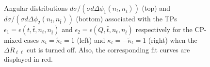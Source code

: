 \documentclass[aps,preprint,tightenlines,floatfix,superscriptaddress,nofootinbib,showpacs]{revtex4-1}
\def\tbar{\bar{t}}
\def\kp{\kappa_t}
\def\kpt{\tilde{\kappa}_t}
\def\TPa{\epsilon(t,\tbar,n_t,n_{\tbar})}
\def\TPb{\epsilon(Q,\tbar,n_t,n_{\tbar})}
\begin{document}
\begin{center}
\begin{figure}[H]
\hspace*{-0.52cm}
\hspace*{-0.006\textwidth}
\caption{Angular distributions $d\sigma/(\sigma
  d\Delta\phi_1(n_t,n_{\tbar}))$ (top) and $d\sigma/(\sigma
  d\Delta\phi_2(n_t,n_{\tbar}))$ (bottom) associated with the TPs
  $\epsilon_1=\TPa$ and $\epsilon_2=\TPb$ respectively for the
  $\mathrm{CP}$-mixed cases $\kp=\kpt=1$ (left) and $\kp=-\kpt=1$
  (right) when the $\Delta R_{\ell\ell}$ cut is turned off. Also, the
  corresponding fit curves are displayed in red.}
\label{fig7}
\end{figure}
\end{center}
\end{document}
